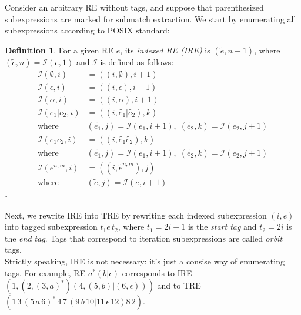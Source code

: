 \documentclass{article}
\newcommand{\Xeq}{\!=\!}
\newcommand{\XI}{\mathcal{I}}
\theoremstyle{definition}
\newtheorem{Xdef}{Definition}
\begin{document}
\begin{multicols}{2}
Consider an arbitrary RE without tags,
and suppose that parenthesized subexpressions are marked for submatch extraction.
We start by enumerating all subexpressions according to POSIX standard:

    \begin{Xdef}
    For a given RE $e$, its \emph{indexed RE (IRE)} is $(\widetilde{e}, n \!-\! 1)$,
    where $(\widetilde{e}, n) \Xeq \XI(e, 1)$
    and $\XI$ is defined as follows:
    \begin{align*}
        \XI(\emptyset, i) &= ((i, \emptyset), i \!+\! 1) \\
        \XI(\epsilon, i) &= ((i, \epsilon), i \!+\! 1) \\
        \XI(\alpha, i) &= ((i, \alpha), i \!+\! 1) \\
        \XI(e_1 | e_2, i) &= ((i, \widetilde{e_1} | \widetilde{e_2}), k) \\
            \text{where }
            & (\widetilde{e_1}, j) \Xeq \XI(e_1, i \!+\! 1),
            \; (\widetilde{e_2}, k) \Xeq \XI(e_2, j \!+\! 1) \\
        \XI(e_1 e_2, i) &= ((i, \widetilde{e_1} \widetilde{e_2}), k) \\
            \text{where }
            & (\widetilde{e_1}, j) \Xeq \XI(e_1, i \!+\! 1),
            \; (\widetilde{e_2}, k) \Xeq \XI(e_2, j \!+\! 1) \\
        \XI(e^{n,m}, i) &= ((i, \widetilde{e}^{n,m}), j) \\
            \text{where } & (\widetilde{e}, j) \Xeq \XI(e, i \!+\! 1)
    \end{align*}
    $\square$
    \end{Xdef}

Next, we rewrite IRE into TRE by rewriting each indexed subexpression $(i, e)$
into tagged subexpression $t_1 e \, t_2$, where $t_1 \Xeq 2i \!-\! 1$ is the \emph{start tag}
and $t_2 \Xeq 2i$ is the \emph{end tag}.
Tags that correspond to iteration subexpressions are called \emph{orbit} tags.
\\

Strictly speaking, IRE is not necessary: it's just a consise way of enumerating tags.
For example, RE $a^* (b | \epsilon)$ corresponds to IRE
$(1,
    (2, (3, a)^*)
    (4, (5, b) | (6, \epsilon))
)$
and to TRE
$(1\,
    3\, (5\, a \,6)^* \,4\,
    7\, (9\, b \,10 | 11\, \epsilon \,12) 8\,
2)$.
\\


\end{multicols}
\end{document}
